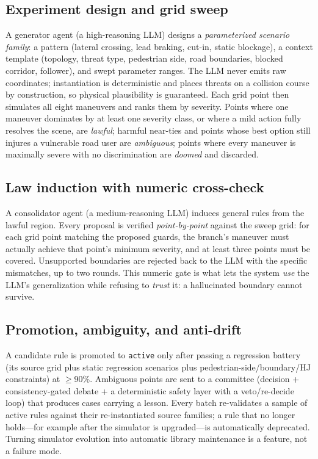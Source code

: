 \documentclass[conference]{IEEEtran}
\begin{document}
\subsection{Experiment design and grid sweep}
A generator agent (a high-reasoning LLM) designs a \emph{parameterized
scenario family}: a pattern (lateral crossing, lead braking, cut-in, static
blockage), a context template (topology, threat type, pedestrian side, road
boundaries, blocked corridor, follower), and swept parameter ranges. The LLM
never emits raw coordinates; instantiation is deterministic and places
threats on a collision course by construction, so physical plausibility is
guaranteed. Each grid point then simulates all eight maneuvers and ranks them
by severity. Points where one maneuver dominates by at least one severity
class, or where a mild action fully resolves the scene, are \emph{lawful};
harmful near-ties and points whose best option still injures a vulnerable
road user are \emph{ambiguous}; points where every maneuver is maximally
severe with no discrimination are \emph{doomed} and discarded.

\subsection{Law induction with numeric cross-check}
A consolidator agent (a medium-reasoning LLM) induces general rules from the
lawful region. Every proposal is verified \emph{point-by-point} against the
sweep grid: for each grid point matching the proposed guards, the branch's
maneuver must actually achieve that point's minimum severity, and at least
three points must be covered. Unsupported boundaries are rejected back to the
LLM with the specific mismatches, up to two rounds. This numeric gate is what
lets the system \emph{use} the LLM's generalization while refusing to
\emph{trust} it: a hallucinated boundary cannot survive.

\subsection{Promotion, ambiguity, and anti-drift}
A candidate rule is promoted to \texttt{active} only after passing a
regression battery (its source grid plus static regression scenarios plus
pedestrian-side/boundary/HJ constraints) at $\ge$90\%. Ambiguous points are
sent to a committee (decision + consistency-gated debate + a deterministic
safety layer with a veto/re-decide loop) that produces cases carrying a
lesson. Every batch re-validates a sample of active rules against their
re-instantiated source families; a rule that no longer holds---for example
after the simulator is upgraded---is automatically deprecated. Turning
simulator evolution into automatic library maintenance is a feature, not a
failure mode.
\end{document}
